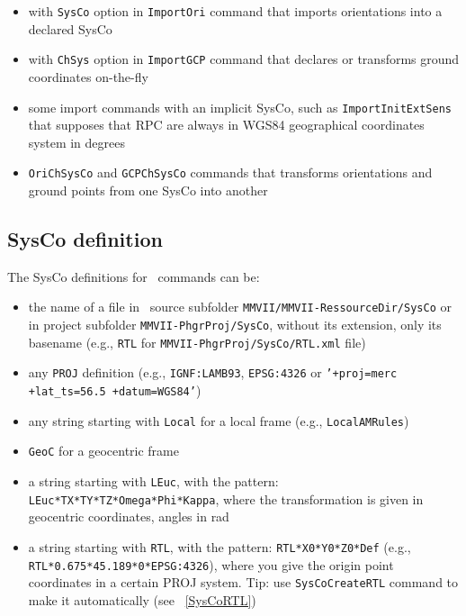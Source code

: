 \begin{itemize}
\item with \texttt{SysCo} option in \texttt{ImportOri} command that imports orientations into a declared SysCo
\item with \texttt{ChSys} option in \texttt{ImportGCP} command that declares or transforms ground coordinates on-the-fly
\item some import commands with an implicit SysCo, such as \texttt{ImportInitExtSens} that supposes that RPC are always in WGS84 geographical coordinates system in degrees
\item \texttt{OriChSysCo} and \texttt{GCPChSysCo} commands that transforms orientations and ground points from one SysCo into another
\end{itemize}

\subsection{SysCo definition}
\label{subsec:SysCoDef}
The SysCo definitions for \CdPPP\ commands can be:
\begin{itemize}
\item the name of a file in \CdPPP\ source subfolder \texttt{MMVII/MMVII-RessourceDir/SysCo} or in project subfolder \texttt{MMVII-PhgrProj/SysCo}, without its extension, only its basename (e.g., \texttt{RTL} for \texttt{MMVII-PhgrProj/SysCo/RTL.xml} file)
\item any \texttt{PROJ} definition (e.g., \texttt{IGNF:LAMB93}, \texttt{EPSG:4326} or \texttt{'+proj=merc +lat\_ts=56.5 +datum=WGS84'})
\item any string starting with \texttt{Local} for a local frame (e.g., \texttt{LocalAMRules})
\item \texttt{GeoC} for a geocentric frame
\item a string starting with \texttt{LEuc}, with the pattern: \texttt{LEuc*TX*TY*TZ*Omega*Phi*Kappa}, where the transformation is given in geocentric coordinates, angles in rad
\item a string starting with \texttt{RTL}, with the pattern: \texttt{RTL*X0*Y0*Z0*Def} (e.g., \texttt{RTL*0.675*45.189*0*EPSG:4326}),
where you give the origin point coordinates in a certain PROJ system. Tip: use \texttt{SysCoCreateRTL} command to make it automatically (see ~\ref{SysCoRTL})

\end{itemize}


